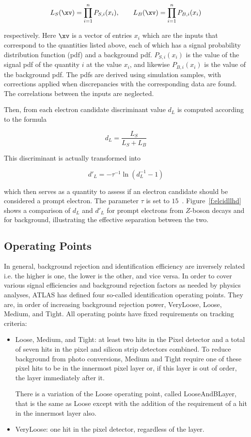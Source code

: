 $$L_S(\xv) = \prod_{i=1}^n P_{S,i}(x_i), \qquad
	L_B(\xv) = \prod_{i=1}^n P_{B,i}(x_i)
$$

respectively. Here $\xv$ is a vector of entries $x_i$ which are the inputs that
correspond to the quantities listed above, each of which has a signal
probability distribution function (pdf) and a background pdf. $P_{S,i}(x_i)$ is
the value of the signal pdf of the quantity $i$ at the value $x_i$, and
likewise $P_{B,i}(x_i)$ is the value of the background pdf. The pdfs are
derived using simulation samples, with corrections applied when discrepancies
with the corresponding data are found. The correlations between the inputs are
neglected.

Then, from each electron candidate discriminant value $d_L$ is computed
according to the formula

$$
	d_L = \frac{L_S}{L_S + L_B}
$$

This discriminant is actually transformed into

\begin{equation}\label{eq:dpl}
	d'_L = -\tau^{-1}\ln (d_L^{-1} - 1)
\end{equation}

which then serves as a quantity to assess if an electron candidate should be
considered a prompt electron. The parameter $\tau$ is set to
$15$~\cite{c4taup}. Figure~\ref{f:elcidllhd} shows a comparison of $d_L$ and
$d'_L$ for prompt electrons from $Z$-boson decays and for background,
illustrating the effective separation between the two.


\subsection{Operating Points}\label{ss:elop}

In general, background rejection and identification efficiency are inversely
related i.e. the higher is one, the lower is the other, and vice versa. In
order to cover various signal efficiencies and background rejection factors as
needed by physics analyses, ATLAS has defined four so-called identification
operating points. They are, in order of increasing background rejection power,
VeryLoose, Loose, Medium, and Tight. All operating points have fixed
requirements on tracking criteria:

\begin{itemize}

	\item Loose, Medium, and Tight: at least two hits in the Pixel detector and a
	      total of seven hits in the pixel and silicon strip detectors combined. To
	      reduce background from photo conversions, Medium and Tight require one of these
	      pixel hits to be in the innermost pixel layer or, if this layer is out of
	      order, the layer immediately after it.

	      There is a variation of the Loose operating point, called LooseAndBLayer, that
	      is the same as Loose except with the addition of the requirement of a hit in
	      the innermost layer also.

	\item  VeryLoose: one hit in the pixel detector, regardless of the layer.
\end{itemize}


